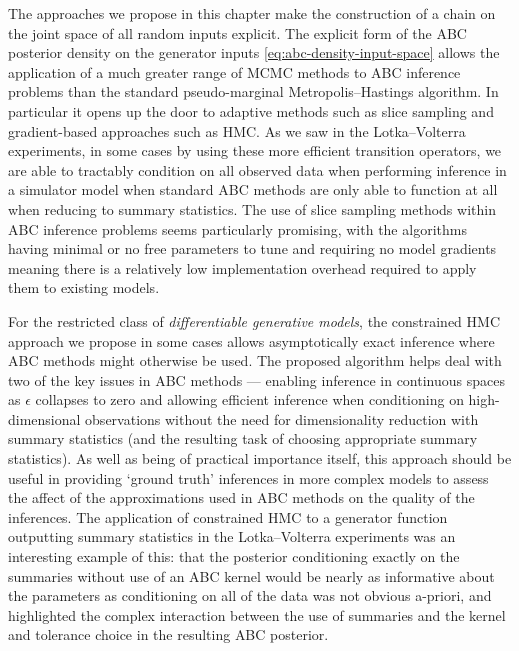 The approaches we propose in this chapter make the construction of a chain on the joint space of all random inputs explicit. The explicit form of the \ac{ABC} posterior density on the generator inputs \eqref{eq:abc-density-input-space} allows the application of a much greater range of \ac{MCMC} methods to \ac{ABC} inference problems than the standard pseudo-marginal Metropolis--Hastings alg\-orithm. In particular it opens up the door to adaptive methods such as slice sampling and gradient-based approaches such as \ac{HMC}. As we saw in the Lotka--Volterra experiments, in some cases by using these more efficient transition operators, we are able to tractably condition on all observed data when performing inference in a simulator model when standard \ac{ABC} methods are only able to function at all when reducing to summary statistics. The use of slice sampling methods within \ac{ABC} inference problems seems particularly promising, with the algorithms having minimal or no free parameters to tune and requiring no model gradients meaning there is a relatively low implementation overhead required to apply them to existing models. 

For the restricted class of \emph{differentiable generative models}, the constrain\-ed \ac{HMC} approach we propose in some cases allows asymptotically exact inference where \ac{ABC} methods might otherwise be used. The proposed algorithm helps deal with two of the key issues in \ac{ABC} methods --- enabling inference in continuous spaces as $\epsilon$ collapses to zero and allowing efficient inference when conditioning on high-dimensional observations without the need for dimensionality reduction with summary statistics (and the resulting task of choosing appropriate summary statistics). As well as being of practical importance itself, this approach should be useful in providing `ground truth' inferences in more complex models to assess the affect of the approximations used in \ac{ABC} methods on the quality of the inferences. The application of constrained \ac{HMC} to a generator function outputting summary statistics in the Lotka--Volterra experiments was an interesting example of this: that the posterior conditioning exactly on the summaries without use of an \ac{ABC} kernel would be nearly as informative about the parameters as conditioning on all of the data was not obvious a-priori, and highlighted the complex interaction between the use of summaries and the kernel and tolerance choice in the resulting \ac{ABC} posterior.

